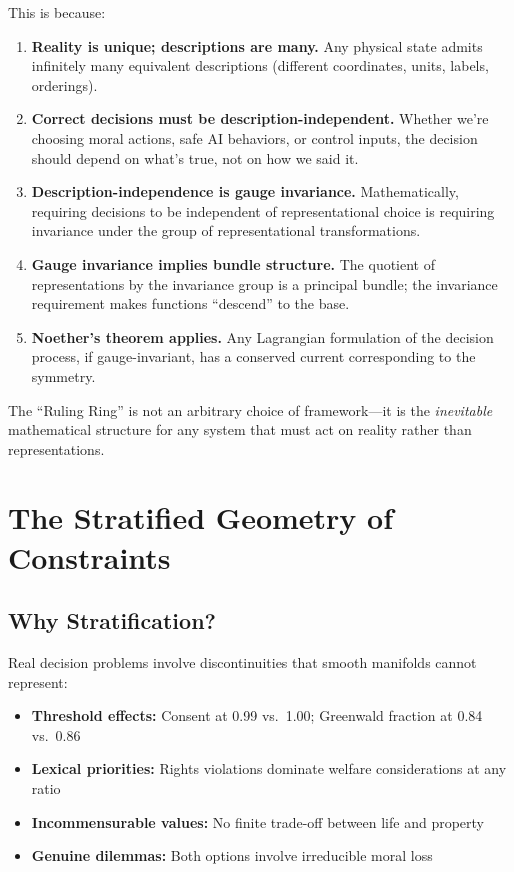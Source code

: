 \documentclass[12pt]{article}
\begin{document}
This is because:

\begin{enumerate}
    \item \textbf{Reality is unique; descriptions are many.} Any physical state admits infinitely many equivalent descriptions (different coordinates, units, labels, orderings).

    \item \textbf{Correct decisions must be description-independent.} Whether we're choosing moral actions, safe AI behaviors, or control inputs, the decision should depend on what's true, not on how we said it.

    \item \textbf{Description-independence is gauge invariance.} Mathematically, requiring decisions to be independent of representational choice is requiring invariance under the group of representational transformations.

    \item \textbf{Gauge invariance implies bundle structure.} The quotient of representations by the invariance group is a principal bundle; the invariance requirement makes functions ``descend'' to the base.

    \item \textbf{Noether's theorem applies.} Any Lagrangian formulation of the decision process, if gauge-invariant, has a conserved current corresponding to the symmetry.
\end{enumerate}

The ``Ruling Ring'' is not an arbitrary choice of framework---it is the \textit{inevitable} mathematical structure for any system that must act on reality rather than representations.

\section{The Stratified Geometry of Constraints}

\subsection{Why Stratification?}

Real decision problems involve discontinuities that smooth manifolds cannot represent:

\begin{itemize}
    \item \textbf{Threshold effects:} Consent at 0.99 vs.\ 1.00; Greenwald fraction at 0.84 vs.\ 0.86
    \item \textbf{Lexical priorities:} Rights violations dominate welfare considerations at any ratio
    \item \textbf{Incommensurable values:} No finite trade-off between life and property
    \item \textbf{Genuine dilemmas:} Both options involve irreducible moral loss
\end{itemize}
\end{document}
